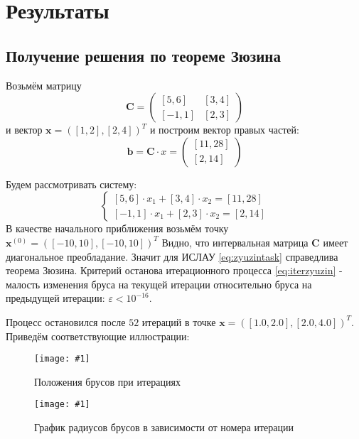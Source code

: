 \documentclass[a4paper,12pt]{article}
\newcommand{\plot}[3]{
    \begin{figure}[H]
        \texttt{[image: \#1]}
        \caption{#2}
        \label{#3}
    \end{figure}
}
\begin{document}
    \section{Результаты}
    \subsection{Получение решения по теореме Зюзина}
    Возьмём матрицу
    \begin{equation}
        \textbf{C} = 
        \begin{pmatrix}
            [5, 6] & [3, 4] \\
            [-1, 1] & [2, 3]
        \end{pmatrix}
    \end{equation}
    и вектор $ \textbf{x} = ([1, 2], [2, 4])^{T} $ и построим вектор правых частей:
    \begin{equation}
        \textbf{b} = \textbf{C} \cdot x =
        \begin{pmatrix}
            [11, 28] \\
            [2, 14]
        \end{pmatrix}
    \end{equation}

    \noindent Будем рассмотривать систему:
    \begin{equation}
        \begin{cases}
            [5, 6] \cdot x_{1} + [3, 4] \cdot x_{2} = [11, 28] \\
            [-1, 1] \cdot x_{1} + [2, 3] \cdot x_{2} = [2, 14]
        \end{cases}
        \label{eq:zyuzintask}
    \end{equation}
    В качестве начального приближения возьмём точку $ \textbf{x}^{(0)} = ([-10, 10], [-10, 10])^{T} $
    Видно, что интервальная матрица $ \textbf{C} $ имеет диагональное преобладание.
    Значит для ИСЛАУ \ref{eq:zyuzintask} справедлива теорема Зюзина. \newline
    Критерий останова итерационного процесса \ref{eq:iterzyuzin} - малость изменения бруса на текущей итерации относительно бруса на предыдущей итерации: $ \varepsilon < 10^{-16} $. \newline

    \noindent Процесс остановился после $ 52 $ итераций в точке $ \textbf{x} = ([1.0, 2.0], [2.0, 4.0])^{T} $. \newline
    Приведём соответствующие иллюстрации:
    \plot{ZyuzinBoxes}{Положения брусов при итерациях}{p:zuyzinboxes}
    \plot{ZyuzinRadiuses}{График радиусов брусов в зависимости от номера итерации}{p:zyuzinradiuses}
\end{document}
